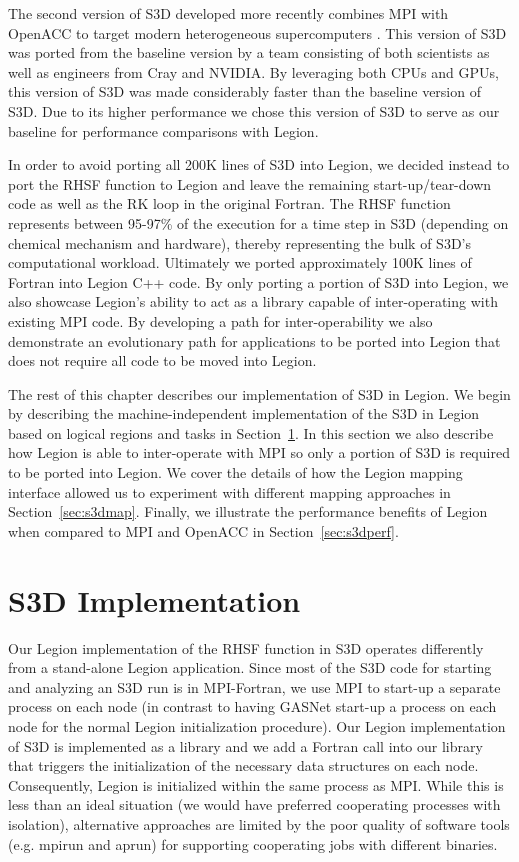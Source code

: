 The second version of S3D developed more recently
combines MPI with OpenACC \cite{OpenACC} to target
modern heterogeneous supercomputers \cite{S3DACC12}.
This version of S3D was ported from the baseline
version by a team consisting of both scientists
as well as engineers from Cray and NVIDIA. By 
leveraging both CPUs and GPUs, this version of S3D
was made considerably faster than the baseline
version of S3D. Due to its higher performance
we chose this version of S3D to serve as our
baseline for performance comparisons with Legion.

In order to avoid porting all 200K lines of S3D 
into Legion, we decided instead to port the RHSF
function to Legion and leave the remaining 
start-up/tear-down code as well as the RK loop
in the original Fortran. The RHSF function represents
between 95-97\% of the execution for a time step
in S3D (depending on chemical mechanism and 
hardware), thereby representing the bulk of S3D's
computational workload. Ultimately we ported 
approximately 100K lines of Fortran into Legion
C++ code. By only porting a portion of S3D into
Legion, we also showcase Legion's ability to 
act as a library capable of inter-operating with
existing MPI code. By developing a path for
inter-operability we also demonstrate an 
evolutionary path for applications to be ported
into Legion that does not require all code to
be moved into Legion.

The rest of this chapter describes our implementation
of S3D in Legion. We begin by describing the 
machine-independent implementation of the S3D in
Legion based on logical regions and tasks in 
Section~\ref{sec:s3dimpl}. In this section we 
also describe how Legion is able to inter-operate
with MPI so only a portion of S3D is required to
be ported into Legion. We cover the details of 
how the Legion mapping interface allowed us to 
experiment with different mapping approaches in 
Section~\ref{sec:s3dmap}. Finally, we illustrate 
the performance benefits of Legion when compared to 
MPI and OpenACC in Section~\ref{sec:s3dperf}.

\section{S3D Implementation}
\label{sec:s3dimpl}
Our Legion implementation of the RHSF function in
S3D operates differently from a stand-alone Legion
application. Since most of the S3D code for starting
and analyzing an S3D run is in MPI-Fortran, we use
MPI to start-up a separate process on each 
node (in contrast to having GASNet start-up a process
on each node for the normal Legion initialization procedure).
Our Legion implementation of S3D is implemented as a 
library and we add a Fortran call into our library
that triggers the initialization of the necessary
data structures on each node. Consequently, Legion
is initialized within the same process as MPI. While
this is less than an ideal situation (we would have
preferred cooperating processes with isolation), 
alternative approaches are limited by the poor quality
of software tools (e.g. mpirun and aprun) for 
supporting cooperating jobs with different binaries.

